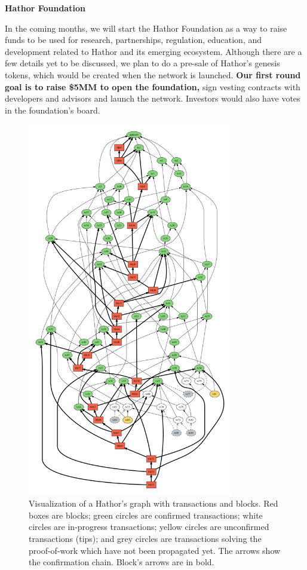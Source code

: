 \documentclass[12pt, a4paper]{article}
\begin{document}
\vspace{1em}
\noindent \textbf{Hathor Foundation}

In the coming months, we will start the Hathor Foundation as a way to raise funds to be used for research, partnerships, regulation, education, and development related to Hathor and its emerging ecosystem. Although there are a few details yet to be discussed, we plan to do a pre-sale of Hathor's genesis tokens, which would be created when the network is launched. \textbf{Our first round goal is to raise \$5MM to open the foundation,} sign vesting contracts with developers and advisors and launch the network. Investors would also have votes in the foundation's board.

\clearpage

\begin{figure}[!htb]
\centering\includegraphics[width=0.8\textwidth]{./images01/sim/hathor-2.pdf}
\caption{Visualization of a Hathor's graph with transactions and blocks. Red boxes are blocks; green circles are confirmed transactions; white circles are in-progress transactions; yellow circles are unconfirmed transactions (tips); and grey circles are transactions solving the proof-of-work which have not been propagated yet. The arrows show the confirmation chain. Block's arrows are in bold. \label{fig:hathor-dag-big}}
\end{figure}
\end{document}
